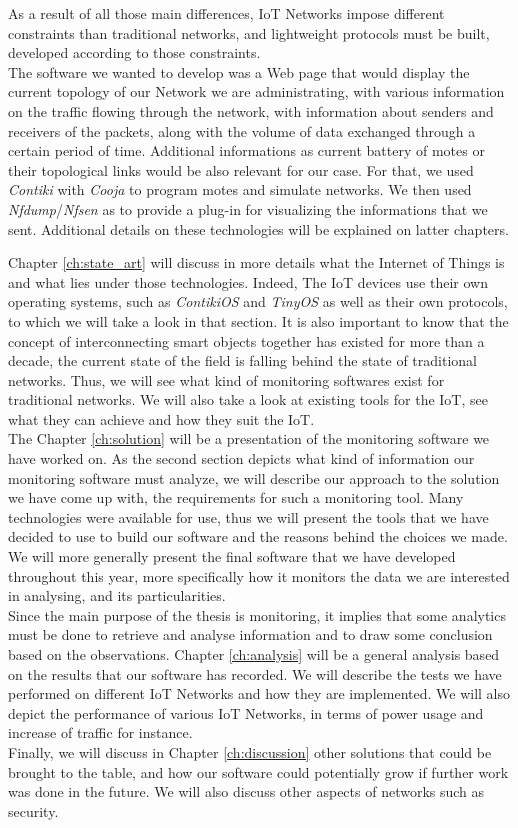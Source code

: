 As a result of all those main differences, IoT Networks impose different constraints than traditional networks, and lightweight protocols must be built, developed according to those constraints.\\

The software we wanted to develop was a Web page that would display the current topology of our Network we are administrating, with various information on the traffic flowing through the network, with information about senders and receivers of the packets, along with the volume of data exchanged through a certain period of time. Additional informations as current battery of motes or their topological links would be also relevant for our case. For that, we used \textit{Contiki} with \textit{Cooja} to program motes and simulate networks. We then used \textit{Nfdump}/\textit{Nfsen} as to provide a plug-in for visualizing the informations that we sent. Additional details on these technologies will be explained on latter chapters.

Chapter \ref{ch:state_art} will discuss in more details what the Internet of Things is and what lies under those technologies. Indeed, The IoT devices use their own operating systems, such as \textit{ContikiOS} and \textit{TinyOS} as well as their own protocols, to which we will take a look in that section. It is also important to know that the concept of interconnecting smart objects together has existed for more than a decade, the current state of the field is falling behind the state of traditional networks. Thus, we will see what kind of monitoring softwares exist for traditional networks. We will also take a look at existing tools for the IoT, see what they can achieve and how they suit the IoT.\\

The Chapter \ref{ch:solution} will be a presentation of the monitoring software we have worked on. As the second section depicts what kind of information our monitoring software must analyze, we will describe our approach to the solution we have come up with, the requirements for such a monitoring tool. Many technologies were available for use, thus we will present the tools that we have decided to use to build our software and the reasons behind the choices we made. We will more generally present the final software that we have developed throughout this year, more specifically how it monitors the data we are interested in analysing, and its particularities. \\

Since the main purpose of the thesis is monitoring, it implies that some analytics must be done to retrieve and analyse information and to draw some conclusion based on the observations. Chapter \ref{ch:analysis} will be a general analysis based on the results that our software has recorded. We will describe the tests we have performed on different IoT Networks and how they are implemented. We will also depict the performance of various IoT Networks, in terms of power usage and increase of traffic for instance.\\

Finally, we will discuss in Chapter \ref{ch:discussion} other solutions that could be brought to the table, and how our software could potentially grow if further work was done in the future. We will also discuss other aspects of networks such as security.
